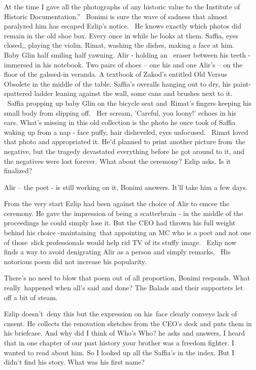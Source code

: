 \documentclass[letterpaper]{article}
\begin{document}
{\textquotedbl}At the time I gave all the photographs of any historic value to the Institute of Historic
Documentation.'' \ Bonimi is sure the wave of sadness that{ }almost paralyzed him has escaped Ezlip's
notice. \ He knows exactly which photos did remain in the old shoe box. Every once in while he looks at them. Saffia,
eyes closed,, playing the violin. Rimat, washing the dishes, making a face at him. Baby Glin half smiling half yawning.
Alir - holding an{ }\ eraser between his teeth - immersed in his notebook. Two pairs of shoes -- one his
and one Alir's -- on the floor of the galssed-in veranda. A textbook of Zakod's entitled {\textquotedbl}Old Versus
Obsolete{\textquotedbl} in the middle of the table. Saffia's overalls hanging out to dry, his paint-spattered ladder
leaning against the wall, some cans and brushes next to it. ~Saffia propping up baby Glin on the bicycle seat
and~Rimat's fingers keeping his small body from slipping off. ~Her scream, 'Careful, you loony!' echoes in his ears.
What's missing in this old collection is the photo he once took of Saffia waking up from a nap - face puffy, hair
disheveled,{ }{eyes
unfocused.} ~Rimat loved that photo and appropriated it. He'd planned to print another picture from~the negative, but
the tragedy devastated everything before he got around to it, and the negatives were lost forever. {\textquotedbl}What
about the ceremony?{\textquotedbl} Ezlip asks. {\textquotedbl}Is it finalized?{\textquotedbl} 

{\textquotedbl}Alir -- the poet - is still working on it,{\textquotedbl} Bonimi answers. {\textquotedbl}It'll take him a
few days.{\textquotedbl} 

From the very start Ezlip had been against the choice of Alir to emcee the ceremony. He gave the impression of being a
scatterbrain - in the middle of the proceedings he could simply lose it. But the CEO had thrown his full weight behind
his choice -maintaining~that appointing an MC who is a poet and not one of those~slick professionals would help rid TV
of its stuffy image.{ }~Ezlip now finds a way to avoid denigrating Alir as a person and simply remarks,
\ {\textquotedbl}His notorious poem did not increase his popularity.{\textquotedbl} 

{\textquotedbl}There's no need to blow that poem out of all proportion,{\textquotedbl} Bonimi responds.
{\textquotedbl}What really~happened when all's said and done? The Balads and their supporters let off a bit of
steam.{\textquotedbl} 

Ezlip doesn't~deny this but the expression on his~face clearly conveys lack of cnsent. He collects the renovation
sketches from the CEO's desk and puts them in his briefcase. {\textquotedbl}And why did I think of Who's
Who?{\textquotedbl} he asks and answers, {\textquotedbl}I heard that in one chapter of our past history your brother
was a freedom fighter. I wanted to read about him. So I looked up all the Saffia's in the index. But I didn't find his
story. What was his first name?{\textquotedbl}~ 
\end{document}
